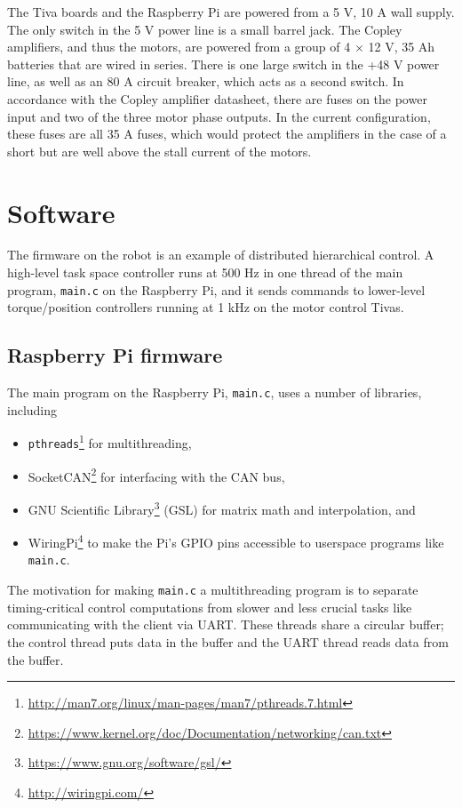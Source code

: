 \documentclass{report}
\begin{document}
The Tiva boards and the Raspberry Pi are powered from a 5 V, 10 A wall supply. The only switch in the 5 V power line is a small barrel jack. The Copley amplifiers, and thus the motors, are powered from a group of 4 $\times$ 12 V, 35 Ah batteries that are wired in series. There is one large switch in the +48 V power line, as well as an 80 A circuit breaker, which acts as a second switch. In accordance with the Copley amplifier datasheet, there are fuses on the power input and two of the three motor phase outputs. In the current configuration, these fuses are all 35 A fuses, which would protect the amplifiers in the case of a short but are well above the stall current of the motors.

\section[Software]{Software}
The firmware on the robot is an example of distributed hierarchical control. A high-level task space controller runs at 500 Hz in one thread of the main program, \texttt{main.c} on the Raspberry Pi, and it sends commands to lower-level torque/position controllers running at 1 kHz on the motor control Tivas.
\subsection[Raspberry Pi firmware]{Raspberry Pi firmware}\label{sec:PiFirmware}
The main program on the Raspberry Pi, \texttt{main.c}, uses a number of libraries, including
\begin{itemize}
\item \texttt{pthreads}\footnote{\url{http://man7.org/linux/man-pages/man7/pthreads.7.html}} for multithreading,
\item SocketCAN\footnote{\url{https://www.kernel.org/doc/Documentation/networking/can.txt}} for interfacing with the CAN bus,
\item GNU Scientific Library\footnote{\url{https://www.gnu.org/software/gsl/}} (GSL) for matrix math and interpolation, and
\item WiringPi\footnote{\url{http://wiringpi.com/}} to make the Pi's GPIO pins accessible to userspace programs like \texttt{main.c}.
\end{itemize}

The motivation for making \texttt{main.c} a multithreading program is to separate timing-critical control computations from slower and less crucial tasks like communicating with the client via UART. These threads share a circular buffer; the control thread puts data in the buffer and the UART thread reads data from the buffer.
\end{document}

